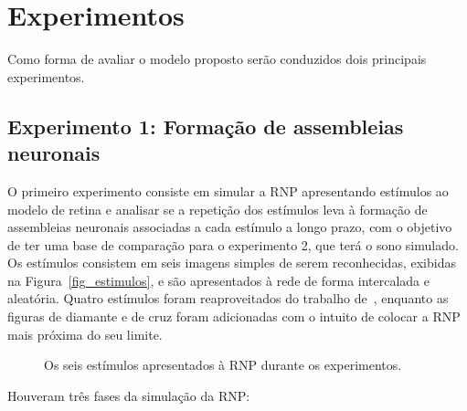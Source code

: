 \chapter{Experimentos}\label{section_experimento}

Como forma de avaliar o modelo proposto serão conduzidos dois principais experimentos.

\section{Experimento 1: Formação de assembleias neuronais}

O primeiro experimento consiste em simular a RNP apresentando estímulos ao modelo de retina e analisar se a repetição dos
estímulos leva à formação de assembleias neuronais associadas a cada estímulo a longo prazo, com o objetivo de ter uma base de
comparação para o experimento 2, que terá o sono simulado. Os estímulos consistem em seis imagens simples de serem reconhecidas,
exibidas na Figura~\ref{fig_estimulos}, e são apresentados à rede de forma intercalada e aleatória. Quatro estímulos foram
reaproveitados do trabalho de~, enquanto as figuras de diamante e de cruz foram adicionadas com o
intuito de colocar a RNP mais próxima do seu limite.

\begin{figure}[!ht]
\caption{Os seis estímulos apresentados à RNP durante os experimentos.}
\end{figure}

Houveram três fases da simulação da RNP:

